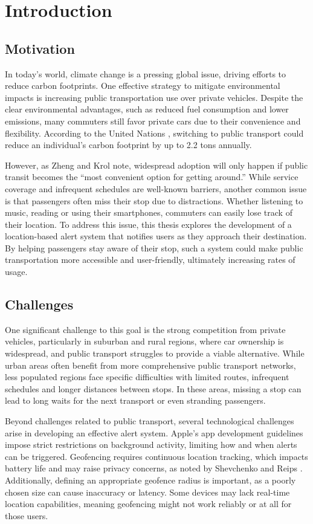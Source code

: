 \chapter{Introduction}
\label{cha:Introduction}

\section{Motivation}
In today's world, climate change is a pressing global issue, driving efforts to reduce carbon footprints.
One effective strategy to mitigate environmental impacts is increasing public transportation use over private vehicles.
Despite the clear environmental advantages, such as reduced fuel consumption and lower emissions, many commuters still favor private cars due to their convenience and flexibility.
According to the United Nations \cite{un2023}, switching to public transport could reduce an individual's carbon footprint by up to 2.2 tons annually.

However, as Zheng and Krol \cite{mit2023} note, widespread adoption will only happen if public transit becomes the “most convenient option for getting around.”
While service coverage and infrequent schedules are well-known barriers, another common issue is that passengers often miss their stop due to distractions.
Whether listening to music, reading or using their smartphones, commuters can easily lose track of their location.
To address this issue, this thesis explores the development of a location-based alert system that notifies users as they approach their destination.
By helping passengers stay aware of their stop, such a system could make public transportation more accessible and user-friendly, ultimately increasing rates of usage.

\section{Challenges}
One significant challenge to this goal is the strong competition from private vehicles, particularly in suburban and rural regions, where car ownership is widespread, and public transport struggles to provide a viable alternative. 
While urban areas often benefit from more comprehensive public transport networks, less populated regions face specific difficulties with limited routes, infrequent schedules and longer distances between stops.
In these areas, missing a stop can lead to long waits for the next transport or even stranding passengers.

Beyond challenges related to public transport, several technological challenges arise in developing an effective alert system. 
Apple's app development guidelines impose strict restrictions on background activity, limiting how and when alerts can be triggered. 
Geofencing requires continuous location tracking, which impacts battery life and may raise privacy concerns, as noted by Shevchenko and Reips \cite{shevchenko2023geofencing}.
Additionally, defining an appropriate geofence radius is important, as a poorly chosen size can cause inaccuracy or latency.
Some devices may lack real-time location capabilities, meaning geofencing might not work reliably or at all for those users.

